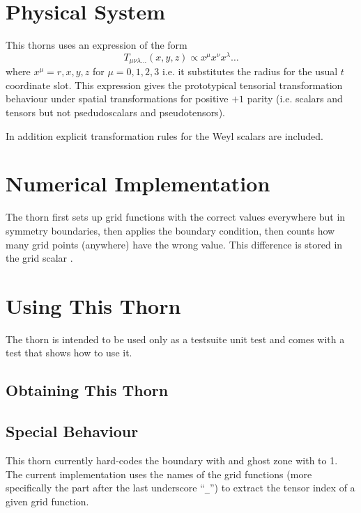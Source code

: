 \section{Physical System}

This thorns uses an expression of the form
\begin{equation}
T_{\mu\nu\lambda\ldots}(x,y,z) \propto x^\mu x^\nu x^\lambda \ldots
\end{equation}
where $x^\mu = {r, x, y, z}$ for $\mu = {0,1,2,3}$ i.e. it substitutes the
radius for the usual $t$ coordinate slot. This expression gives the
prototypical tensorial transformation behaviour under spatial transformations
for positive $+1$ parity (i.e. scalars and tensors but not psedudoscalars and
pseudotensors).

In addition explicit transformation rules for the Weyl scalars are included.

\section{Numerical Implementation}

The thorn first sets up grid functions with the correct values everywhere but
in symmetry boundaries, then applies the boundary condition, then counts how
many grid points (anywhere) have the wrong value. This difference is stored in
the grid scalar .

\section{Using This Thorn}

The thorn is intended to be used only as a testsuite unit test and comes with
a test  that shows how to use it.

\subsection{Obtaining This Thorn}

\subsection{Special Behaviour}

This thorn currently hard-codes the boundary with and ghost zone with to 1.
The current implementation uses the names of the grid functions (more
specifically the part after the last underscore ``\verb|_|'') to extract the
tensor index of a given grid function.

